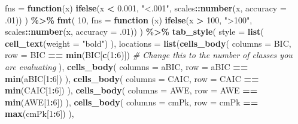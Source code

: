 \documentclass[
]{book}
\newenvironment{Shaded}{\begin{snugshade}}{\end{snugshade}}
\newcommand{\AttributeTok}[1]{\textcolor[rgb]{0.13,0.29,0.53}{#1}}
\newcommand{\CommentTok}[1]{\textcolor[rgb]{0.56,0.35,0.01}{\textit{#1}}}
\newcommand{\ControlFlowTok}[1]{\textcolor[rgb]{0.13,0.29,0.53}{\textbf{#1}}}
\newcommand{\DecValTok}[1]{\textcolor[rgb]{0.00,0.00,0.81}{#1}}
\newcommand{\FloatTok}[1]{\textcolor[rgb]{0.00,0.00,0.81}{#1}}
\newcommand{\FunctionTok}[1]{\textcolor[rgb]{0.13,0.29,0.53}{\textbf{#1}}}
\newcommand{\NormalTok}[1]{#1}
\newcommand{\SpecialCharTok}[1]{\textcolor[rgb]{0.81,0.36,0.00}{\textbf{#1}}}
\newcommand{\StringTok}[1]{\textcolor[rgb]{0.31,0.60,0.02}{#1}}
\begin{document}
\begin{Shaded}
\begin{Highlighting}[]
    \AttributeTok{fns =} \ControlFlowTok{function}\NormalTok{(x)}
      \FunctionTok{ifelse}\NormalTok{(x }\SpecialCharTok{\textless{}} \FloatTok{0.001}\NormalTok{, }\StringTok{"\textless{}.001"}\NormalTok{,}
\NormalTok{             scales}\SpecialCharTok{::}\FunctionTok{number}\NormalTok{(x, }\AttributeTok{accuracy =}\NormalTok{ .}\DecValTok{01}\NormalTok{))}
\NormalTok{  ) }\SpecialCharTok{\%\textgreater{}\%}
  \FunctionTok{fmt}\NormalTok{(}
    \DecValTok{10}\NormalTok{,}
    \AttributeTok{fns =} \ControlFlowTok{function}\NormalTok{ (x)}
      \FunctionTok{ifelse}\NormalTok{(x }\SpecialCharTok{\textgreater{}} \DecValTok{100}\NormalTok{, }\StringTok{"\textgreater{}100"}\NormalTok{,}
\NormalTok{             scales}\SpecialCharTok{::}\FunctionTok{number}\NormalTok{(x, }\AttributeTok{accuracy =}\NormalTok{ .}\DecValTok{01}\NormalTok{))}
\NormalTok{  ) }\SpecialCharTok{\%\textgreater{}\%}  
  \FunctionTok{tab\_style}\NormalTok{(}
    \AttributeTok{style =} \FunctionTok{list}\NormalTok{(}
      \FunctionTok{cell\_text}\NormalTok{(}\AttributeTok{weight =} \StringTok{"bold"}\NormalTok{)}
\NormalTok{      ),}
    \AttributeTok{locations =} \FunctionTok{list}\NormalTok{(}\FunctionTok{cells\_body}\NormalTok{(}
     \AttributeTok{columns =}\NormalTok{ BIC,}
     \AttributeTok{row =}\NormalTok{ BIC }\SpecialCharTok{==} \FunctionTok{min}\NormalTok{(BIC[}\FunctionTok{c}\NormalTok{(}\DecValTok{1}\SpecialCharTok{:}\DecValTok{6}\NormalTok{)]) }\CommentTok{\# Change this to the number of classes you are evaluating}
\NormalTok{    ),}
    \FunctionTok{cells\_body}\NormalTok{(}
     \AttributeTok{columns =}\NormalTok{ aBIC,}
     \AttributeTok{row =}\NormalTok{ aBIC }\SpecialCharTok{==} \FunctionTok{min}\NormalTok{(aBIC[}\DecValTok{1}\SpecialCharTok{:}\DecValTok{6}\NormalTok{])}
\NormalTok{    ),}
    \FunctionTok{cells\_body}\NormalTok{(}
     \AttributeTok{columns =}\NormalTok{ CAIC,}
     \AttributeTok{row =}\NormalTok{ CAIC }\SpecialCharTok{==} \FunctionTok{min}\NormalTok{(CAIC[}\DecValTok{1}\SpecialCharTok{:}\DecValTok{6}\NormalTok{])}
\NormalTok{    ),}
    \FunctionTok{cells\_body}\NormalTok{(}
     \AttributeTok{columns =}\NormalTok{ AWE,}
     \AttributeTok{row =}\NormalTok{ AWE }\SpecialCharTok{==} \FunctionTok{min}\NormalTok{(AWE[}\DecValTok{1}\SpecialCharTok{:}\DecValTok{6}\NormalTok{])}
\NormalTok{    ),}
    \FunctionTok{cells\_body}\NormalTok{(}
     \AttributeTok{columns =}\NormalTok{ cmPk,}
     \AttributeTok{row =}\NormalTok{  cmPk }\SpecialCharTok{==} \FunctionTok{max}\NormalTok{(cmPk[}\DecValTok{1}\SpecialCharTok{:}\DecValTok{6}\NormalTok{])}
\NormalTok{     ),    }

\end{Highlighting}
\end{Shaded}
\end{document}

